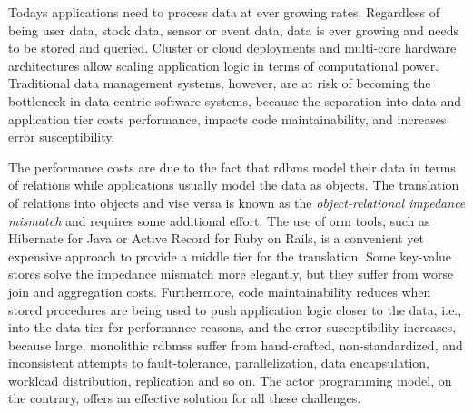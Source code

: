 
  Todays applications need to process data at ever growing rates.
  Regardless of being user data, stock data, sensor or event data, data is ever growing and needs to be stored and queried.
  Cluster or cloud deployments and multi-core hardware architectures allow scaling application logic in terms of computational power.
  Traditional data management systems, however, are at risk of becoming the bottleneck in data-centric software systems, because the separation into data and application tier costs performance, impacts code maintainability, and increases error susceptibility.

The performance costs are due to the fact that \gls{rdbms} model their data in terms of relations while applications usually model the data as objects. The translation of relations into objects and vise versa is known as the \emph{object-relational impedance mismatch} and requires some additional effort. The use of \gls{orm} tools, such as Hibernate for Java or Active Record for Ruby on Rails, is a convenient yet expensive approach to provide a middle tier for the translation. Some key-value stores solve the impedance mismatch more elegantly, but they suffer from worse join and aggregation costs. Furthermore, code maintainability reduces when stored procedures are being used to push application logic closer to the data, {i.e.}, into the data tier for performance reasons, and the error susceptibility increases, because large, monolithic \glspl{rdbms} suffer from hand-crafted, non-standardized, and inconsistent attempts to fault-tolerance, parallelization, data encapsulation, workload distribution, replication and so on. The actor programming model, on the contrary, offers an effective solution for all these challenges.

